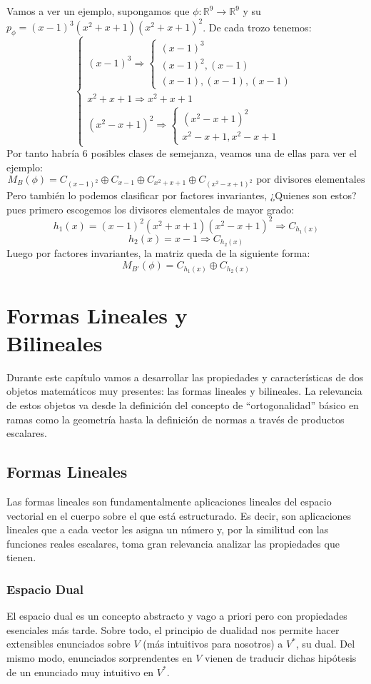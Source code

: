 \documentclass[10pt,a4paper,openright]{book}
\theoremstyle{break}
\begin{document}
Vamos a ver un ejemplo, supongamos que $\phi: \mathbb R^9\rightarrow \mathbb R^9$ y su $p_\phi= (x-1)^3(x^2+x+1)(x^2+x+1)^2$. De cada trozo tenemos:
$$\begin{cases}(x-1)^3 \Rightarrow \begin{cases} (x-1)^3 \\ (x-1)^2, (x-1) \\ (x-1), (x-1), (x-1) \end{cases} \\ x^2+x+1 \Rightarrow x^2+x+1\\ (x^2-x+1)^2\Rightarrow \begin{cases}(x^2-x+1)^2 \\ x^2-x+1, x^2-x+1 \end{cases}\end{cases}$$
Por tanto habría 6 posibles clases de semejanza, veamos una de ellas para ver el ejemplo:
$$M_B(\phi)=C_{(x-1)^2}\oplus C_{x-1}\oplus C_{x^2+x+1}\oplus C_{(x^2-x+1)^2}\mbox{	 por divisores elementales}$$
Pero también lo podemos clasificar por factores invariantes, ¿Quienes son estos? pues primero escogemos los divisores elementales de mayor grado:
$$h_1(x)=(x-1)^2(x^2+x+1)(x^2-x+1)^2\Rightarrow C_{h_1(x)}$$
$$h_2(x)=x-1\Rightarrow C_{h_2(x)}$$
Luego por factores invariantes, la matriz queda de la siguiente forma:
$$M_{B'}(\phi)=C_{h_1(x)}\oplus C_{h_2(x)}$$

\chapter{Formas Lineales y \\ Bilineales}
Durante este capítulo vamos a desarrollar las propiedades y características de dos objetos matemáticos muy presentes: las formas lineales y bilineales. La relevancia de estos objetos va desde la definición del concepto de ``ortogonalidad'' básico en ramas como la geometría hasta la definición de normas a través de productos escalares.

\section{Formas Lineales}
Las formas lineales son fundamentalmente aplicaciones lineales del espacio vectorial en el cuerpo sobre el que está estructurado. Es decir, son aplicaciones lineales que a cada vector les asigna un número y, por la similitud con las funciones reales escalares, toma gran relevancia analizar las propiedades que tienen.

\subsection{Espacio Dual}
El espacio dual es un concepto abstracto y vago a priori pero con propiedades esenciales más tarde. Sobre todo, el principio de dualidad nos permite hacer extensibles enunciados sobre $V$ (más intuitivos para nosotros) a $V^*$, su dual. Del mismo modo, enunciados sorprendentes en $V$ vienen de traducir dichas hipótesis de un enunciado muy intuitivo en $V^*$.
\end{document}
